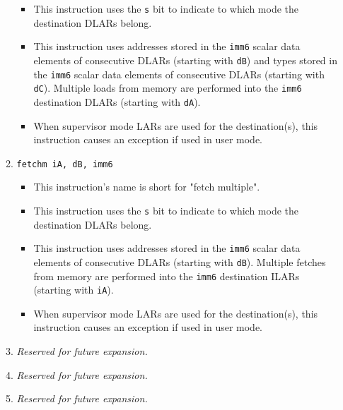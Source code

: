 \documentclass{article}
\begin{document}
\begin{itemize}
\begin{enumerate}
\begin{itemize}
				\item This instruction uses the \texttt{s} bit to indicate
				to which mode the destination DLARs belong.

				\item This instruction uses addresses stored in the
				\texttt{imm6} scalar data elements of consecutive DLARs
				(starting with \texttt{dB}) and types stored in the
				\texttt{imm6} scalar data elements of consecutive DLARs
				(starting with \texttt{dC}).  Multiple loads from memory
				are performed into the \texttt{imm6} destination DLARs
				(starting with \texttt{dA}).

				\item When supervisor mode LARs are used for the
				destination(s), this instruction causes an exception if
				used in user mode.
				\end{itemize}

			\item \texttt{fetchm iA, dB, imm6}
				\begin{itemize}
				\item This instruction's name is short for "fetch
				multiple".

				\item This instruction uses the \texttt{s} bit to indicate
				to which mode the destination DLARs belong.

				\item This instruction uses addresses stored in the
				\texttt{imm6} scalar data elements of consecutive DLARs
				(starting with \texttt{dB}).  Multiple fetches from memory
				are performed into the \texttt{imm6} destination ILARs
				(starting with \texttt{iA}).

				\item When supervisor mode LARs are used for the
				destination(s), this instruction causes an exception if
				used in user mode.
				\end{itemize}
			\item \textit{Reserved for future expansion.}
			\item \textit{Reserved for future expansion.}
			\item \textit{Reserved for future expansion.}
			\end{enumerate}
		\end{itemize}
		\newpage
\end{document}
